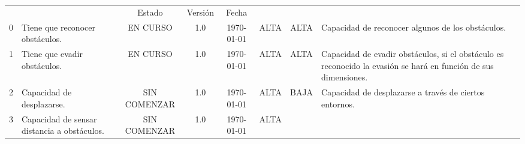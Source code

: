 \begin{landscape}
\begin{tabular}{| l | m{4.5cm} | c | c | c | c | c | m{5.5cm} |}
    \cline{1-8}    
    & & Estado & Versión & Fecha & & & \\  
    0 &                                                 %
    Tiene que reconocer obstáculos. &           %
    \cellcolor{yellow}  EN CURSO  & 1.0 & \today &      %
    ALTA &                                              %
    ALTA &                                              %
    Capacidad de reconocer algunos de los obstáculos.\\\hline
    1 &                                                 %
    Tiene que evadir obstáculos. &                      %
    \cellcolor{yellow} EN CURSO & 1.0 & \today &        %
    ALTA &                                              %
    ALTA &                                              %
    Capacidad de evadir obstáculos, si el obstáculo es reconocido la evasión se hará en función de sus dimensiones.\\\hline
    2 &                                                 %
    Capacidad de desplazarse.   &                       %
    \cellcolor{red} SIN COMENZAR & 1.0 & \today &       %
    ALTA &                                              %
    BAJA &                                              %
    Capacidad de desplazarse a través de ciertos entornos.\\\hline   
    3 &                                                 %
    Capacidad de sensar distancia a obstáculos.   &     %
    \cellcolor{red} SIN COMENZAR & 1.0 & \today &       %
    ALTA &                                              %

\end{tabular}
\end{landscape}
